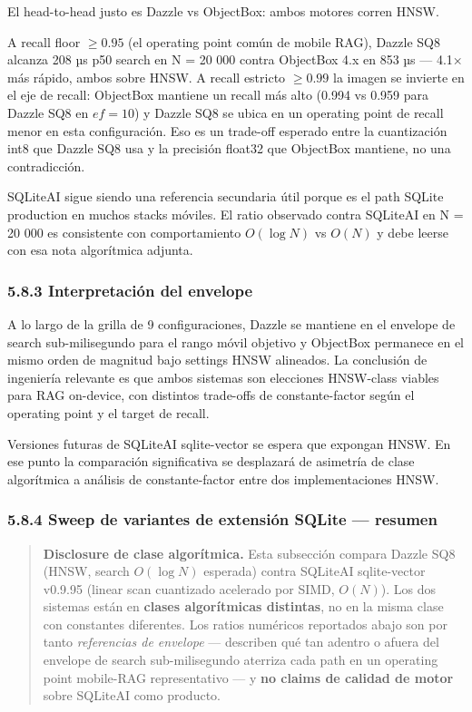 El head-to-head justo es Dazzle vs ObjectBox: ambos motores corren HNSW.

A recall floor \(\geq 0.95\) (el operating point común de mobile RAG), Dazzle
SQ8 alcanza 208 µs p50 search en N = 20 000 contra ObjectBox 4.x en 853 µs ---
4.1× más rápido, ambos sobre HNSW. A recall estricto \(\geq 0.99\) la imagen se
invierte en el eje de recall: ObjectBox mantiene un recall más alto (0.994 vs
0.959 para Dazzle SQ8 en \(ef = 10\)) y Dazzle SQ8 se ubica en un operating
point de recall menor en esta configuración. Eso es un trade-off esperado entre
la cuantización int8 que Dazzle SQ8 usa y la precisión float32 que ObjectBox
mantiene, no una contradicción.

SQLiteAI sigue siendo una referencia secundaria útil porque es el path SQLite
production en muchos stacks móviles. El ratio observado contra SQLiteAI en N =
20 000 es consistente con comportamiento \(O(\log N)\) vs \(O(N)\) y debe leerse
con esa nota algorítmica adjunta.

\subsubsection{5.8.3 Interpretación del
envelope}\label{interpretaciuxf3n-del-envelope}

A lo largo de la grilla de 9 configuraciones, Dazzle se mantiene en el envelope
de search sub-milisegundo para el rango móvil objetivo y ObjectBox permanece en
el mismo orden de magnitud bajo settings HNSW alineados. La conclusión de
ingeniería relevante es que ambos sistemas son elecciones HNSW-class viables
para RAG on-device, con distintos trade-offs de constante-factor según el
operating point y el target de recall.

Versiones futuras de SQLiteAI sqlite-vector se espera que expongan HNSW. En ese
punto la comparación significativa se desplazará de asimetría de clase
algorítmica a análisis de constante-factor entre dos implementaciones HNSW.

\subsubsection{5.8.4 Sweep de variantes de extensión SQLite ---
resumen}\label{sweep-de-variantes-de-extensiuxf3n-sqlite-resumen}

\begin{quote}
\textbf{Disclosure de clase algorítmica.} Esta subsección compara Dazzle SQ8
(HNSW, search \(O(\log N)\) esperada) contra SQLiteAI sqlite-vector v0.9.95
(linear scan cuantizado acelerado por SIMD, \(O(N)\)). Los dos sistemas están en
\textbf{clases algorítmicas distintas}, no en la misma clase con constantes
diferentes. Los ratios numéricos reportados abajo son por tanto
\emph{referencias de envelope} --- describen qué tan adentro o afuera del
envelope de search sub-milisegundo aterriza cada path en un operating point
mobile-RAG representativo --- y \textbf{no claims de calidad de motor} sobre
SQLiteAI como producto.
\end{quote}


